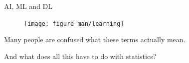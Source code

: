 \documentclass[11pt,compress,t,notes=noshow, xcolor=table]{beamer}
\begin{document}

\begin{frame}{AI, ML and DL}
  
  \begin{center}
    
    \begin{figure}
      \texttt{[image: figure\_man/learning]} 
    \end{figure}
  \end{center}
  \lz
  
  Many people are confused what these terms actually mean. 
  
  \lz
  
  And what does all this have to do with statistics?
  
  
\end{frame}

\end{document}
